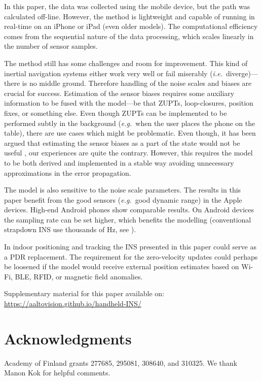 \documentclass[conference]{ieeetran}
\newcommand{\eg}{\textit{e.g.}}
\newcommand{\ie}{\textit{i.e.}}
\begin{document}
In this paper, the data was collected using the mobile device, but the path was calculated off-line. However, the method is lightweight and capable of running in real-time on an iPhone or iPad (even older models). The computational efficiency comes from the sequential nature of the data processing, which scales linearly in the number of sensor samples.

The method still has some challenges and room for improvement. This kind of inertial navigation systems either work very well or fail miserably (\ie\ diverge)---there is no middle ground. Therefore handling of the noise scales and biases are crucial for success. Estimation of the sensor biases requires some auxiliary information to be fused with the model---be that ZUPTs, loop-closures, position fixes, or something else. Even though ZUPTs can be implemented to be performed subtly in the background (\eg\ when the user places the phone on the table), there are use cases which might be problematic. Even though, it has been argued that estimating the sensor biases as a part of the state would not be useful \cite{Nilsson+Zachariah+Skog+Handel:2013}, our experiences are quite the contrary. However, this requires the model to be both derived and implemented in a stable way avoiding unnecessary approximations in the error propagation.

The model is also sensitive to the noise scale parameters. The results in this paper benefit from the good sensors (\eg\ good dynamic range) in the Apple devices. High-end Android phones show comparable results. On Android devices the sampling rate can be set higher, which benefits the modelling (conventional strapdown INS use thousands of Hz, see \cite{Titterton+Weston:2004}).


In indoor positioning and tracking the INS presented in this paper could serve as a PDR replacement. The requirement for the zero-velocity updates could perhaps be loosened if the model would receive external position estimates based on Wi-Fi, BLE, RFID, or magnetic field anomalies.

Supplementary material for this paper available on: \\
\mbox{\url{https://aaltovision.github.io/handheld-INS/}}








\section*{Acknowledgments}
\noindent
Academy of Finland grants 277685, 295081, 308640, and 310325. We thank Manon Kok for helpful comments.





{\small }
\end{document}
